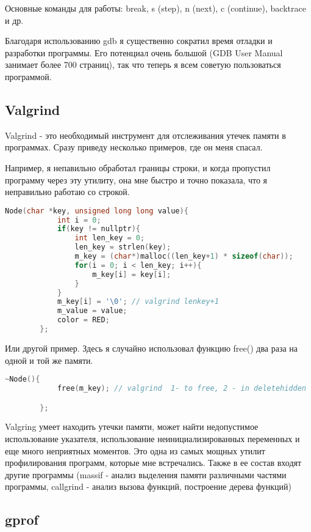 Основные команды для работы: break, s (step), n (next), c (continue), backtrace и др. 

Благодаря использованию gdb я существенно сократил время отладки и разработки программы. Его потенциал очень большой (GDB User Manual занимает более 700 страниц), так что теперь я всем советую пользоваться программой.

\subsection{Valgrind}

Valgrind - это необходимый инструмент для отслеживания утечек памяти в программах. Сразу приведу несколько примеров, где он меня спасал. 

Например, я непавильно обработал границы строки, и когда пропустил программу через эту утилиту, она мне быстро и точно показала, что я неправильно работаю со строкой.

\begin{lstlisting}[language=C]
 Node(char *key, unsigned long long value){
            int i = 0;
            if(key != nullptr){
                int len_key = 0;
                len_key = strlen(key);
                m_key = (char*)malloc((len_key+1) * sizeof(char));
                for(i = 0; i < len_key; i++){
                    m_key[i] = key[i];
                }
            }
            m_key[i] = '\0'; // valgrind lenkey+1        
            m_value = value;
            color = RED;
        };
\end{lstlisting}

Или другой пример. Здесь я случайно использовал функцию free() два раза на одной и той же памяти.

\begin{lstlisting}[language=C]
~Node(){
            free(m_key); // valgrind  1- to free, 2 - in deletehidden

        };
\end{lstlisting}

Valgring умеет находить утечки памяти, может найти недопустимое использование указателя, использование неинициализированных переменных и еще много неприятных моментов. Это одна из самых мощных утилит профилирования программ, которые мне встречались. Также в ее состав входят другие программы (massif - анализ выделения памяти различными частями программы, callgrind - анализ вызова функций, построение дерева функций)

\subsection{gprof}

